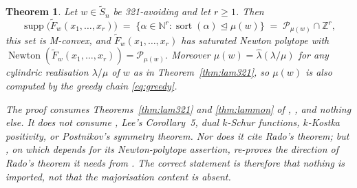 \documentclass[11pt]{article}
\theoremstyle{plain}
\newtheorem{thm}{Theorem}[section]
\theoremstyle{definition}
\DeclareMathOperator{\supp}{supp}
\DeclareMathOperator{\Newton}{Newton}
\DeclareMathOperator{\sort}{sort}
\newcommand{\Z}{\mathbb{Z}}
\newcommand{\N}{\mathbb{N}}
\newcommand{\Saff}{\widetilde{S}_{n}}
\newcommand{\Fw}{\widetilde{F}_{w}}
\newcommand{\Perm}{\mathcal{P}}
\begin{document}
\begin{thm}\label{thm:main}
Let $w\in\Saff$ be 321-avoiding and let $r\ge1$. Then
\[
  \supp\bigl(\Fw(x_1,\dots,x_r)\bigr)\;=\;\{\alpha\in\N^{r}:\sort(\alpha)\trianglelefteq\mu(w)\}
  \;=\;\Perm_{\mu(w)}\cap\Z^{r},
\]
this set is M-convex, and $\Fw(x_1,\dots,x_r)$ has saturated Newton polytope with
$\Newton(\Fw(x_1,\dots,x_r))=\Perm_{\mu(w)}$. Moreover $\mu(w)=\hat\lambda(\lambda/\mu)$ for
any cylindric realisation $\lambda/\mu$ of $w$ as in Theorem~\ref{thm:lam321}, so $\mu(w)$ is
also computed by the greedy chain \eqref{eq:greedy}.

The proof consumes Theorems~\ref{thm:lam321} and \ref{thm:lammon} of \cite{Lam2006},
\cite[Thm.~7.1]{Clio2026}, and nothing else. It does not consume \cite[Cor.~8.5]{Lam2008},
Lee's Corollary~5, dual $k$-Schur functions, $k$-Kostka positivity, or Postnikov's symmetry
theorem. Nor does it \emph{cite} Rado's theorem; but \cite[\S8]{Clio2026}, on which
\cite[Thm.~7.1]{Clio2026} depends for its Newton-polytope assertion, re-proves the direction of
Rado's theorem it needs from \cite[Lem.~4.1]{Clio2026}. The correct statement is therefore that
nothing is imported, not that the majorisation content is absent.
\end{thm}
\end{document}

